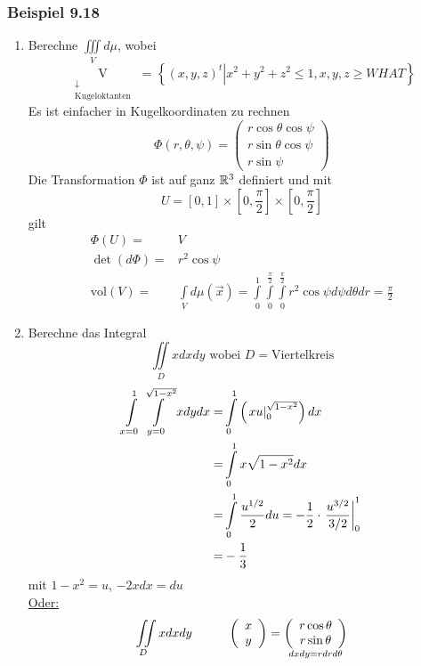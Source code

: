 \subsubsection*{Beispiel 9.18}
\begin{enumerate}
\item Berechne $\iiint\limits_V d\mu$, wobei \[\mathop {\text{V}}\limits_{\begin{array}{*{20}{c}}
 \downarrow \\
{{\text{Kugeloktanten}}}
\end{array}} {\text{ = }}\left\{ {\left. {{{\left( {x,y,z} \right)}^t}} \right|{x^2} + {y^2} + {z^2} \le 1,x,y,z \ge WHAT} \right\}\] Es ist einfacher in Kugelkoordinaten zu rechnen
\[\Phi \left( {r,\theta ,\psi } \right) = \left( {\begin{array}{*{20}{c}}
{r\cos \theta \cos \psi }\\
{r\sin \theta \cos \psi }\\
{r\sin \psi }
\end{array}} \right)\]
Die Transformation $\Phi$ ist auf ganz $\mathbb{R}^3$ definiert und mit \[U = \left[ {0,1} \right] \times \left[ {0,\frac{\pi }{2}} \right] \times \left[ {0,\frac{\pi }{2}} \right]\]
gilt
\begin{align*}
\Phi\left( U\right) =&V\\
\det\left( d\Phi\right)=&r^2\cos\psi\\
\text{vol}\left(V\right)=&\int\limits_{V} d\mu\left( \vec x\right)=\int\limits_0^1\int\limits_0^{\frac{\pi}{2}}\int\limits_0^{\frac{\pi}{2}} r^2\cos\psi d\psi d\theta dr=\frac{\pi}{2}
\end{align*}
\item Berechne das Integral
\[ \iint\limits_D x dx dy\text{ wobei $D=$Viertelkreis}\]
\begin{align*}
\int\limits_{x = 0}^1 {\int\limits_{y = 0}^{\sqrt {1 - {x^2}} } x } dydx =&\int\limits_0^1 {\left( {\left. {xu} \right|_0^{\sqrt {1 - {x^2}} }} \right)dx} \\
=&\int\limits_0^1 x\sqrt{1-x^2}dx\\
=&\int\limits_0^1 {\frac{{{u^{{1 \mathord{\left/
 {\vphantom {1 2}} \right.
 \kern-\nulldelimiterspace} 2}}}}}{2}} du =  - \frac{1}{2} \cdot \left. {\frac{{{u^{{3 \mathord{\left/
 {\vphantom {3 2}} \right.
 \kern-\nulldelimiterspace} 2}}}}}{{{3 \mathord{\left/
 {\vphantom {3 2}} \right.
 \kern-\nulldelimiterspace} 2}}}} \right|_0^1\\
=&-\frac{1}{3}
\end{align*}
mit $1-x^2=u$, $-2xdx=du$\\
\underline{Oder:}\\
\[ \iint\limits_D x dx dy \hspace{10mm}\left( {\begin{array}{*{20}{c}}
x\\
y
\end{array}} \right) = \mathop {\left( {\begin{array}{*{20}{c}}
{r\cos \theta }\\
{r\sin \theta }
\end{array}} \right)}\limits_{dxdy = rdrd\theta } \]


\end{enumerate}
